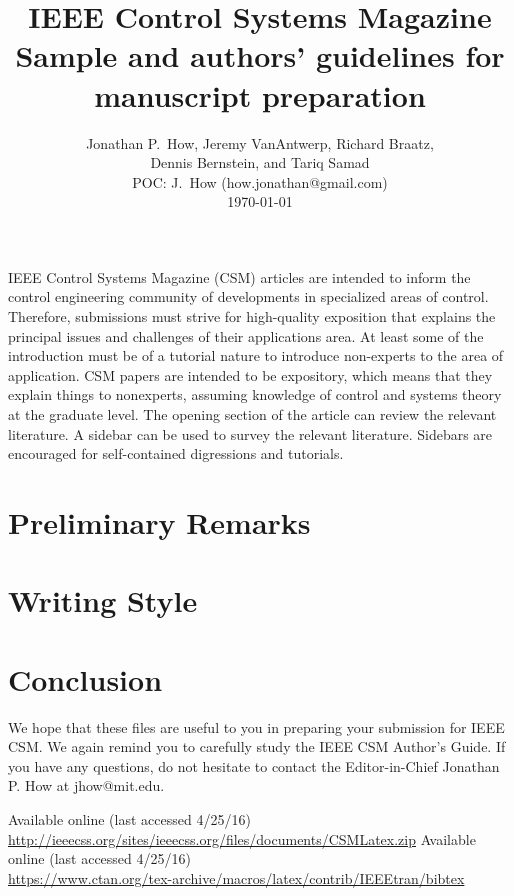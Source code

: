 \documentclass[letterpaper,12pt,peerreviewca,draftcls]{IEEEtran}
\title{IEEE Control Systems Magazine\\
\Large Sample and authors’ guidelines for manuscript preparation}
\author{Jonathan P.\ How, Jeremy VanAntwerp, Richard Braatz,\\ Dennis Bernstein, and Tariq Samad\\
	POC: J.\ How (how.jonathan@gmail.com)\\ \today }
\begin{document}
\maketitle
\CSMsetup
\linenumbers \modulolinenumbers[2] %

IEEE Control Systems Magazine (CSM) articles are intended to inform the control engineering community of developments in specialized areas of control. Therefore, submissions must strive for high-quality exposition that explains the principal issues and challenges of their applications area. At least some of the introduction must be of a tutorial nature to introduce non-experts to the area of application. CSM papers are intended to be expository, which means that they explain things to nonexperts, assuming knowledge of control and systems theory at the graduate level. The opening section of the article can review the relevant literature. 
A sidebar can be used to survey the relevant literature. Sidebars are encouraged for self-contained digressions and tutorials.

\section{Preliminary Remarks}





\section{Writing Style}


\section{Conclusion}
We hope that these files are useful to you in preparing your submission for IEEE CSM. We again remind you to carefully study the IEEE CSM Author’s Guide. If you have any questions, do not hesitate to contact the Editor-in-Chief Jonathan P. How at jhow@mit.edu.

%
%
\begin{thebibliography}{10}
 Available online (last accessed 4/25/16)\\ \url{http://ieeecss.org/sites/ieeecss.org/files/documents/CSMLatex.zip}	
 Available online (last accessed 4/25/16)\\ \url{https://www.ctan.org/tex-archive/macros/latex/contrib/IEEEtran/bibtex}
\end{thebibliography}
\end{document}
